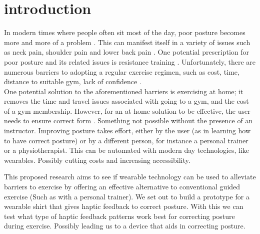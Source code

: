 \documentclass[sigconf]{acmart}
\begin{document}
\maketitle
\section{introduction}
In modern times where people often sit most of the day, poor posture becomes more and more of a problem \cite{subasi2015evaluation}. This can manifest itself in a variety of issues such as neck pain, shoulder pain and lower back pain \cite{hush2006risk, sadeghian2012persistent, o2011association}. One potential prescription for poor posture and its related issues is resistance training \cite{falla2007effect, steffens2016prevention, ruivo2017effects}. Unfortunately, there are numerous barriers to adopting a regular exercise regimen, such as cost, time, distance to suitable gym, lack of confidence \cite{greenwood2015motivators, mailey2016overcoming, sechrist1987development}.  \\


One potential solution to the aforementioned barriers is exercising at home; it removes the time and travel issues associated with going to a gym, and the cost of a gym membership. However, for an at home solution to be effective, the user needs to ensure correct form \cite{winett2001potential}. Something not possible without the presence of an instructor. Improving posture takes effort, either by the user (as in learning how to have correct posture) or by a different person, for instance a personal trainer or a physiotherapist. This can be automated with modern day technologies, like wearables. Possibly cutting costs and increasing accessibility. 

This proposed research aims to see if wearable technology can be used to alleviate barriers to exercise by offering an effective alternative to conventional guided exercise (Such as with a personal trainer). We set out to build a prototype for a wearable shirt that gives haptic feedback to correct posture. With this we can test what type of haptic feedback patterns work best for correcting posture during exercise. Possibly leading us to a device that aids in correcting posture.
\end{document}
